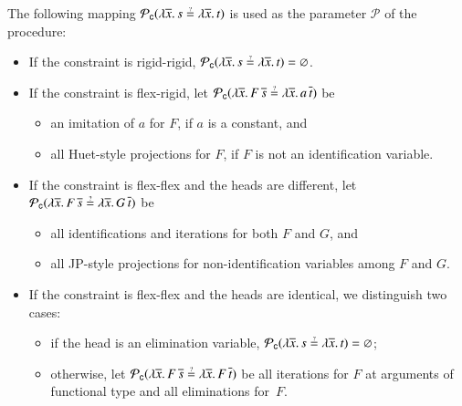 \noindent
The following mapping $\mathcal{P}_\mathsf{c}(\lambda \overline{x}.
\, s \unif \lambda \overline{x}. \, t)$ is used as the parameter $\mathcal{P}$ of the procedure:
\begin{itemize}
  \setlength\itemsep{1\jot}

    \item If the constraint is rigid-rigid, $\mathcal{P}_\mathsf{c}(\lambda \overline{x}.
    \, s \unif \lambda \overline{x}. \, t) = \varnothing$.

    \item If the constraint is flex-rigid,
    let 
    $\mathcal{P}_\mathsf{c}(\lambda \overline{x}. \, F \,\overline{s} \unif \lambda \overline{x}. \, a\, \overline{t})$ 
    be 
    \begin{itemize}
        \item an imitation of $a$ for $F$, if $a$ is a constant, and
        \item all Huet-style projections for $F$, if $F$ is not an identification variable.
    \end{itemize}
    
    \item If the constraint is flex-flex and the heads are different,
    let 
    $\mathcal{P}_\mathsf{c}(\lambda \overline{x}. \, F \,\overline{s} \unif \lambda \overline{x}. \, G\, \overline{t})$ 
    be 
    \begin{itemize}
        \item all identifications and iterations for both $F$ and $G$, and
        \item all JP-style projections for non-identification variables among $F$ and $G$.
    \end{itemize}
    
    \item If the constraint is flex-flex and the heads are identical,
    we distinguish two cases:
    \begin{itemize}
        \item if the head is an elimination variable, 
        $\mathcal{P}_\mathsf{c}(\lambda \overline{x}.\, s \unif \lambda \overline{x}.\, t ) = \varnothing$;
        \item otherwise, let 
        $\mathcal{P}_\mathsf{c}(\lambda \overline{x}. \, F \,\overline{s} \unif \lambda \overline{x}. \, F\, \overline{t})$ 
        be all iterations for $F$ at arguments of functional type and
        all eliminations for~$F$.
    \end{itemize}
\end{itemize}

